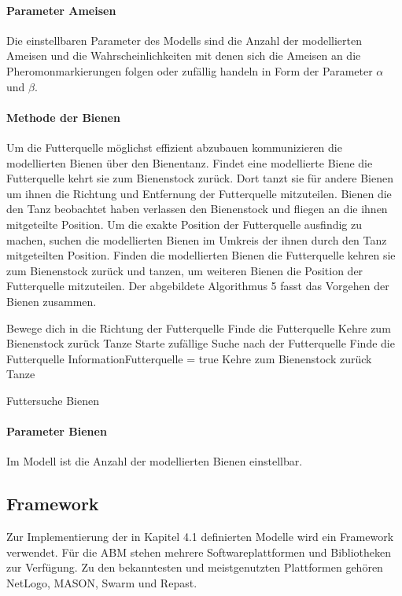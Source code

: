 \documentclass[a4paper, 11pt]{article}
\begin{document}
\paragraph{Parameter Ameisen}
Die einstellbaren Parameter des Modells sind die Anzahl der modellierten Ameisen und die Wahrscheinlichkeiten mit denen sich die Ameisen an die Pheromonmarkierungen folgen oder zufällig handeln in Form der Parameter $\alpha$ und $\beta$.
\paragraph{Methode der Bienen}
Um die Futterquelle möglichst effizient abzubauen kommunizieren die modellierten Bienen über den  Bienentanz. Findet eine modellierte Biene die Futterquelle kehrt sie zum Bienenstock zurück. Dort tanzt sie für andere Bienen um ihnen die Richtung und Entfernung der Futterquelle mitzuteilen. Bienen die den Tanz beobachtet haben verlassen den Bienenstock und fliegen an die ihnen mitgeteilte Position. Um die exakte Position der Futterquelle ausfindig zu machen, suchen die modellierten Bienen im Umkreis der ihnen durch den Tanz mitgeteilten Position. Finden die modellierten Bienen die Futterquelle kehren sie zum Bienenstock zurück und tanzen, um weiteren Bienen die Position der Futterquelle mitzuteilen. Der abgebildete Algorithmus 5 fasst das Vorgehen der Bienen zusammen.
\begin{framed}
	\begin{algorithm}[H]
		{
			Bewege dich in die Richtung der Futterquelle\;
			Finde die Futterquelle\;
			Kehre zum Bienenstock zurück\;
			Tanze\;
		}
		{
			{
				Starte zufällige Suche nach der Futterquelle\;
				{
					Finde die Futterquelle\;
					InformationFutterquelle = true\;
					Kehre zum Bienenstock zurück\;
					Tanze\;					
				}	
			}
		}
		\caption{Futtersuche Bienen}
		\label{futtersuchebco}
	\end{algorithm}
\end{framed}
\paragraph{Parameter Bienen}
Im Modell ist die Anzahl der modellierten Bienen einstellbar.
\subsection{Framework}
Zur Implementierung der in Kapitel 4.1 definierten Modelle wird ein Framework verwendet. Für die \acs{ABM} stehen mehrere Softwareplattformen und Bibliotheken zur Verfügung. Zu den bekanntesten und meistgenutzten Plattformen gehören NetLogo, MASON, Swarm und Repast.
\end{document}
